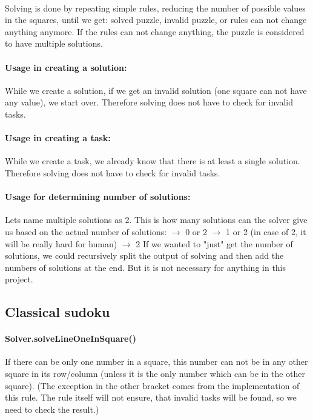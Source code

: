 \documentclass{report}
\begin{document}
\paragraph{}
Solving is done by repeating simple rules, reducing the number of possible values in the squares, until we get: solved puzzle, invalid puzzle, or rules can not change anything anymore. If the rules can not change anything, the puzzle is considered to have multiple solutions.

\paragraph{Usage in creating a solution:}
While we create a solution, if we get an invalid solution (one square can not have any value), we start over. Therefore solving does not have to check for invalid tasks.

\paragraph{Usage in creating a task:}
While we create a task, we already know that there is at least a single solution. Therefore solving does not have to check for invalid tasks.

\paragraph{Usage for determining number of solutions:}
Lets name multiple solutions as 2. This is how many solutions can the solver give us based on the actual number of solutions:\newline
{} $\rightarrow$ 0 or 2 \newline
{} $\rightarrow$ 1 or 2 (in case of 2, it will be really hard for human) \newline
{} $\rightarrow$ 2 \newline
If we wanted to "just" get the number of solutions, we could recursively split the output of solving and then add the numbers of solutions at the end. But it is not necessary for anything in this project.

\subsection{Classical sudoku}

\paragraph{Solver.solveLineOneInSquare()}
If there can be only one number in a square, this number can not be in any other square in its row/column (unless it is the only number which can be in the other square). (The exception in the other bracket comes from the implementation of this rule. The rule itself will not ensure, that invalid tasks will be found, so we need to check the result.)
\end{document}

